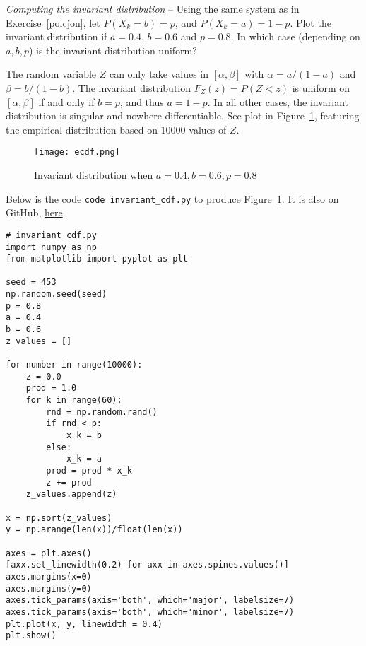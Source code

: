\documentclass[oneside,10pt]{book}
\begin{document}
\begin{Exercise}\label{polcjonb} {\em Computing the invariant distribution} --
Using the same system as in Exercise~\ref{polcjon}, let $P(X_k = b) = p$, and $P(X_k=a) = 1-p$.
Plot the invariant distribution
  if $a=0.4$, $b=0.6$ and $p=0.8$. In which case (depending on $a,b,p$) is the invariant distribution uniform?\vspace{1ex}


\noindent The random variable $Z$ can only take values in $[\alpha, \beta]$ with $\alpha = a/(1-a)$ and $\beta=b/(1-b)$. The invariant
 distribution $F_Z(z) = P(Z<z)$ is uniform on $[\alpha,\beta]$ if and only if $b=p$, and thus $a=1-p$. In all other cases, the
 invariant distribution is singular and nowhere differentiable. See plot in Figure~\ref{fig:r1lkn2x},
 featuring the \textcolor{index}{empirical distribution} based on $\num{10000}$ values of $Z$.

\begin{figure}[H]
\centering
\texttt{[image: ecdf.png]}
\caption{Invariant distribution when $a=0.4, b=0.6, p=0.8$}
\label{fig:r1lkn2x}
\end{figure}

\noindent Below is the code \texttt{code invariant\_cdf.py} to produce Figure~\ref{fig:r1lkn2x}.
It is also on GitHub, \href{https://github.com/VincentGranville/Stochastic-Processes/blob/master/invariant_cdf.py}{here}.
\vspace{1ex}

\begin{lstlisting}
# invariant_cdf.py
import numpy as np
from matplotlib import pyplot as plt

seed = 453
np.random.seed(seed)
p = 0.8
a = 0.4
b = 0.6
z_values = []

for number in range(10000):
    z = 0.0
    prod = 1.0
    for k in range(60):
        rnd = np.random.rand()
        if rnd < p:
            x_k = b
        else:
            x_k = a
        prod = prod * x_k
        z += prod
    z_values.append(z)

x = np.sort(z_values)
y = np.arange(len(x))/float(len(x))

axes = plt.axes()
[axx.set_linewidth(0.2) for axx in axes.spines.values()]
axes.margins(x=0)
axes.margins(y=0)
axes.tick_params(axis='both', which='major', labelsize=7)
axes.tick_params(axis='both', which='minor', labelsize=7)
plt.plot(x, y, linewidth = 0.4)
plt.show()
\end{lstlisting}

\end{Exercise}
\end{document}
